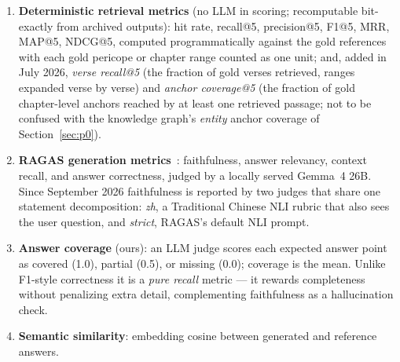 \begin{enumerate}
\item \textbf{Deterministic retrieval metrics} (no LLM in scoring;
recomputable bit-exactly from archived outputs): hit rate, recall@5,
precision@5, F1@5, MRR, MAP@5, NDCG@5,
computed program\-matically against the gold references with each gold
pericope or chapter range counted as one unit; and, added in July 2026,
\emph{verse recall@5} (the fraction of gold verses retrieved, ranges
expanded verse by verse) and \emph{anchor coverage@5} (the fraction of
gold chapter-level anchors reached by at least one retrieved passage;
not to be confused with the knowledge graph's \emph{entity} anchor
coverage of Section~\ref{sec:p0}).
\item \textbf{RAGAS generation metrics}~\cite{es2023ragas}:
faithfulness, answer relevancy, context recall, and answer correctness,
judged by a locally served Gemma~4 26B. Since September 2026
faithfulness is reported by two judges that share one statement
decomposition: \emph{zh}, a Traditional Chinese NLI rubric that also
sees the user question, and \emph{strict}, RAGAS's default NLI prompt.
\item \textbf{Answer coverage} (ours): an LLM judge scores each expected
answer point as covered (1.0), partial (0.5), or missing (0.0); coverage
is the mean. Unlike F1-style correctness it is a \emph{pure recall}
metric --- it rewards completeness without penalizing extra detail,
complementing faithfulness as a hallucination check.
\item \textbf{Semantic similarity}: embedding cosine between generated
and reference answers.
\end{enumerate}

